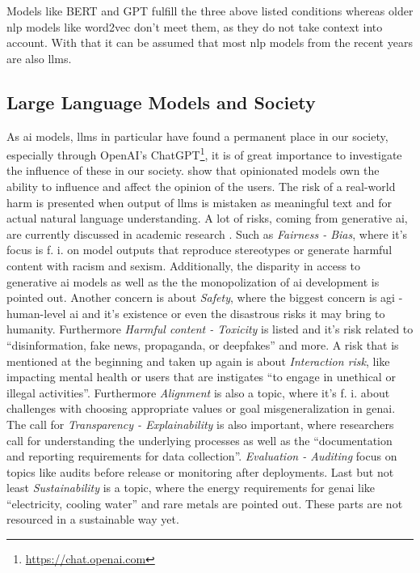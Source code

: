 Models like BERT \citep{devlin} and GPT \citep{radford-gpt} fulfill the three above listed conditions whereas older \acrshort{nlp} models like word2vec \citep{word2vec} don't meet them, as they do not take context into account. With that it can be assumed that most \acrshort{nlp} models from the recent years are also \acrshort{llms}. 




\subsection{Large Language Models and Society}
As \acrshort{ai} models, \acrshort{llms} in particular have found a permanent place in our society, especially through OpenAI's ChatGPT\footnote{\url{https://chat.openai.com}}, it is of great importance to investigate the influence of these in our society. \citet{opinionatedlm} show that opinionated models own the ability to influence and affect the opinion of the users. The risk of a real-world harm is presented when output of \acrshort{llms} is mistaken as meaningful text and for actual natural language understanding.
A lot of risks, coming from generative \acrshort{ai}, are currently discussed in academic research \citep{hagendorff-mapping}. Such as \textit{Fairness - Bias}, where it's focus is f. i. on model outputs that reproduce stereotypes or generate harmful content with racism and sexism. Additionally, the disparity in access to generative \acrshort{ai} models as well as the the monopolization of \acrshort{ai} development is pointed out. Another concern is about \textit{Safety}, 
where the biggest concern is \acrshort{agi} - human-level \acrshort{ai} and it's existence or even the disastrous risks it may bring to humanity. Furthermore \textit{Harmful content - Toxicity} is listed and it's risk related to \enquote{disinformation, fake news, propaganda, or deepfakes} and more. 
 A risk that is mentioned at the beginning and taken up again is about \textit{Interaction risk}, like impacting mental health or users that are instigates \enquote{to engage in unethical or illegal activities}. Furthermore \textit{Alignment} is also a topic, where it's f. i. about challenges with choosing appropriate values or goal misgeneralization in \acrshort{genai}.
 The call for \textit{Transparency - Explainability} is also important, where researchers call for understanding the underlying processes as well as the \enquote{documentation and reporting requirements for data collection}. \textit{Evaluation - Auditing} focus on topics like audits before release or monitoring after deployments. Last but not least \textit{Sustainability} is a topic, where the energy requirements for \acrshort{genai} like \enquote{electricity, cooling water} and rare metals are pointed out. These parts are not resourced in a sustainable way yet. 
